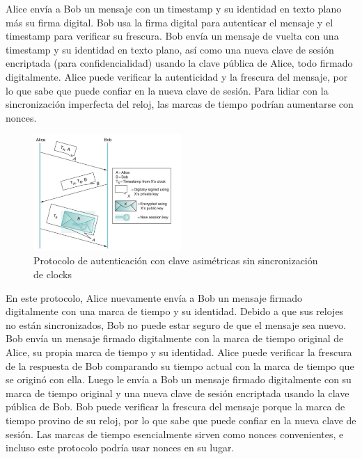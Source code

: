 Alice envía a Bob un mensaje con un timestamp y su identidad en texto plano más su firma digital. Bob usa la firma digital para autenticar el mensaje y el timestamp para verificar su frescura. Bob envía un mensaje de vuelta con una timestamp y su identidad en texto plano, así como una nueva clave de sesión encriptada (para confidencialidad) usando la clave pública de Alice, todo firmado digitalmente. Alice puede verificar la autenticidad y la frescura del mensaje, por lo que sabe que puede confiar en la nueva clave de sesión. Para lidiar con la sincronización imperfecta del reloj, las marcas de tiempo podrían aumentarse con nonces.

\begin{figure}[H]
	\centering
	\includegraphics[width=0.5\textwidth
]{images/public-key-authentication-2.png}
	\caption[Protocolo de autenticación con clave asimétricas]{Protocolo de autenticación con clave asimétricas sin sincronización de clocks}
	\label{fig:public-key-authentication-2}
\end{figure}
En este protocolo, Alice nuevamente envía a Bob un mensaje firmado digitalmente con una marca de tiempo y su identidad. Debido a que sus relojes no están sincronizados, Bob no puede estar seguro de que el mensaje sea nuevo. Bob envía un mensaje firmado digitalmente con la marca de tiempo original de Alice, su propia marca de tiempo y su identidad. Alice puede verificar la frescura de la respuesta de Bob comparando su tiempo actual con la marca de tiempo que se originó con ella. Luego le envía a Bob un mensaje firmado digitalmente con su marca de tiempo original y una nueva clave de sesión encriptada usando la clave pública de Bob. Bob puede verificar la frescura del mensaje porque la marca de tiempo provino de su reloj, por lo que sabe que puede confiar en la nueva clave de sesión. Las marcas de tiempo esencialmente sirven como nonces convenientes, e incluso este protocolo podría usar nonces en su lugar.

